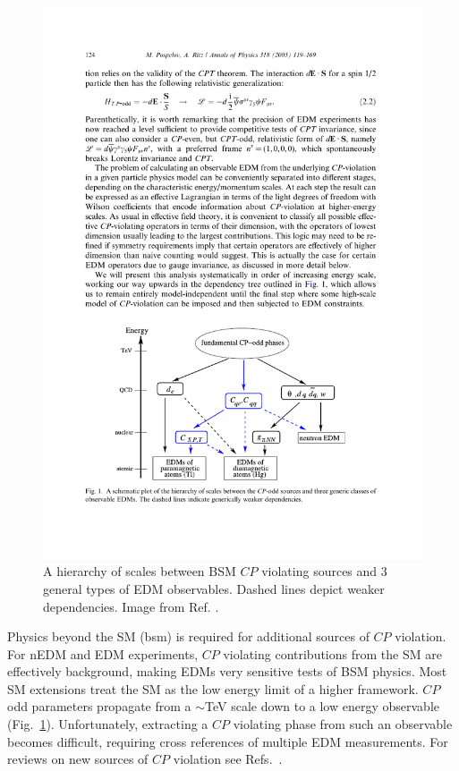 \begin{figure}
    \centering
    \includegraphics[width=0.75 \textwidth]{figures/Pospelov_BSM_CPV.pdf}
    \caption[A hierarchy of scales between BSM $CP$ violating sources and 3 general types of EDM observables.]
    {A hierarchy of scales between BSM $CP$ violating sources and 3 general types of EDM observables. Dashed lines depict weaker dependencies. Image from Ref. \cite{POS05}.}
    \label{fig:bsm_cp_violation}
\end{figure}

Physics beyond the SM (\acrshort{bsm}) is required for additional sources of $CP$ violation. For nEDM and EDM experiments, $CP$ violating contributions from the SM are effectively background, making EDMs very sensitive tests of BSM physics. Most SM extensions treat the SM as the low energy limit of a higher framework. $CP$\textendash odd parameters propagate from a $\sim$\unit{\tera\eV} scale down to a low energy observable (Fig.~\ref{fig:bsm_cp_violation}). Unfortunately, extracting a $CP$ violating phase from such an observable becomes difficult, requiring cross references of multiple EDM measurements. For reviews on new sources of $CP$ violation see Refs.~\cite{Cir10, POS05, ENG13, CHU19}.

